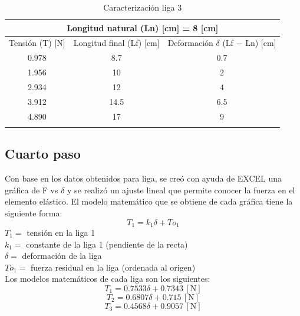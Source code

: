 \documentclass[12pt, titlepage]{report}
\newcommand{\unit}[1]{\ensuremath{\, \mathrm{#1}}}
\begin{document}
    \newpage
    \begin{longtable}{|c|c|c|}
        \hline
        \multicolumn{3}{|c|}{Longitud natural (Ln) [cm] = 8 [cm]} \\ \hline
        Tensión (T) [N] & Longitud final (Lf) [cm] & Deformación $\delta$  (Lf $-$ Ln) [cm] \\ \hline
        0.978 & 8.7 & 0.7 \\ \hline
        1.956 & 10 & 2 \\ \hline
        2.934 & 12 & 4 \\ \hline
        3.912 & 14.5 & 6.5 \\ \hline
        4.890 & 17 & 9 \\ \hline
        \caption{Caracterización liga 3}
    \end{longtable}

    \subsection*{Cuarto paso}
    Con base en los datos obtenidos para liga, se creó con ayuda de EXCEL una gráfica de F vs $\delta$ y se realizó un ajuste lineal que permite conocer la fuerza en el elemento elástico. El modelo matemático que se obtiene de cada gráfica tiene la siguiente forma: 
    $$T_1=k_1\delta+To_1$$
    $T_1= $ tensión en la liga 1 \\
    $k_1= $ constante de la liga 1 (pendiente de la recta) \\
    $\delta= $ deformación de la liga \\
    $To_1= $ fuerza residual en la liga (ordenada al origen)\\

    Los modelos matemáticos de cada liga son los siguientes:
    $$T_1 = 0.7533\delta + 0.7343 \unit{[N]}$$
    $$T_2 = 0.6807\delta + 0.715 \unit{[N]}$$
    $$T_3 = 0.4568\delta + 0.9057 \unit{[N]}$$
\end{document}
